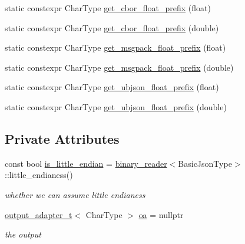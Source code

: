 \begin{DoxyCompactItemize}
static constexpr Char\+Type \hyperlink{classnlohmann_1_1detail_1_1binary__writer_a2b5cb010077da6241a18bb334736464c}{get\+\_\+cbor\+\_\+float\+\_\+prefix} (float)
\item 
static constexpr Char\+Type \hyperlink{classnlohmann_1_1detail_1_1binary__writer_afe5ac43e05973ba09ee79227bb589b59}{get\+\_\+cbor\+\_\+float\+\_\+prefix} (double)
\item 
static constexpr Char\+Type \hyperlink{classnlohmann_1_1detail_1_1binary__writer_ad452d114696407b98abc69b6001c270e}{get\+\_\+msgpack\+\_\+float\+\_\+prefix} (float)
\item 
static constexpr Char\+Type \hyperlink{classnlohmann_1_1detail_1_1binary__writer_a47234a6e7ac9206d43553985f4cacbf2}{get\+\_\+msgpack\+\_\+float\+\_\+prefix} (double)
\item 
static constexpr Char\+Type \hyperlink{classnlohmann_1_1detail_1_1binary__writer_a6837b20574152f7f645d0f6cd9fafdeb}{get\+\_\+ubjson\+\_\+float\+\_\+prefix} (float)
\item 
static constexpr Char\+Type \hyperlink{classnlohmann_1_1detail_1_1binary__writer_a19eb47a53dbbe28f319532bef25d84e6}{get\+\_\+ubjson\+\_\+float\+\_\+prefix} (double)
\end{DoxyCompactItemize}
\subsection*{Private Attributes}
\begin{DoxyCompactItemize}
\item 
const bool \hyperlink{classnlohmann_1_1detail_1_1binary__writer_a048887c907afe39759b777e8c888414c}{is\+\_\+little\+\_\+endian} = \hyperlink{classnlohmann_1_1detail_1_1binary__reader}{binary\+\_\+reader}$<$Basic\+Json\+Type$>$\+::little\+\_\+endianess()
\begin{DoxyCompactList}\small\item\em whether we can assume little endianess \end{DoxyCompactList}\item 
\hyperlink{namespacenlohmann_1_1detail_a9b680ddfb58f27eb53a67229447fc556}{output\+\_\+adapter\+\_\+t}$<$ Char\+Type $>$ \hyperlink{classnlohmann_1_1detail_1_1binary__writer_a6f15b782a7900f50ef37d123008e601b}{oa} = nullptr
\begin{DoxyCompactList}\small\item\em the output \end{DoxyCompactList}\end{DoxyCompactItemize}


